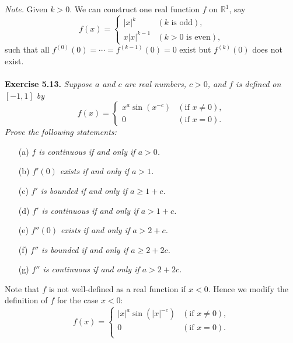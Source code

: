 \documentclass{article}
\begin{document}
\emph{Note.}
Given $k > 0$.
We can construct one real function $f$ on $\mathbb{R}^1$, say
  \begin{equation*}
    f(x) =
    \begin{cases}
      |x|^k      & (\text{$k$ is odd}), \\
      x|x|^{k-1} & (\text{$k > 0$ is even}),
    \end{cases}
  \end{equation*}
such that
all $f^{(0)}(0) = \cdots = f^{(k-1)}(0) = 0$ exist but $f^{(k)}(0)$ does not exist.
\\\\






\textbf{Exercise 5.13.}
\emph{Suppose $a$ and $c$ are real numbers, $c > 0$,
and $f$ is defined on $[-1,1]$ by
  \begin{equation*}
  f(x) =
    \begin{cases}
      x^a \sin{(x^{-c})} & (\text{if } x \neq 0), \\
      0                  & (\text{if } x = 0).
    \end{cases}
  \end{equation*}
Prove the following statements:}
\begin{enumerate}
  \item[(a)]
  \emph{$f$ is continuous if and only if $a > 0$.}

  \item[(b)]
  \emph{$f'(0)$ exists if and only if $a > 1$.}

  \item[(c)]
  \emph{$f'$ is bounded if and only if $a \geq 1+c$.}

  \item[(d)]
  \emph{$f'$ is continuous if and only if $a > 1+c$.}

  \item[(e)]
  \emph{$f''(0)$ exists if and only if $a > 2 + c$.}

  \item[(f)]
  \emph{$f''$ is bounded if and only if $a \geq 2+2c$.}

  \item[(g)]
  \emph{$f''$ is continuous if and only if $a > 2+2c$.} \\
\end{enumerate}

Note that $f$ is not well-defined as a real function if $x < 0$.
Hence we modify the definition of $f$ for the case $x < 0$:
  \begin{equation*}
  f(x) =
    \begin{cases}
      |x|^a \sin{(|x|^{-c})} & (\text{if } x \neq 0), \\
      0                      & (\text{if } x = 0). \\
    \end{cases}
  \end{equation*}
\end{document}
